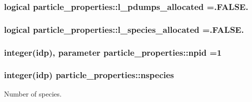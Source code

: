 \subsubsection[{\texorpdfstring{l\+\_\+pdumps\+\_\+allocated}{l_pdumps_allocated}}]{\setlength{\rightskip}{0pt plus 5cm}logical particle\+\_\+properties\+::l\+\_\+pdumps\+\_\+allocated =.F\+A\+L\+S\+E.}\hypertarget{namespaceparticle__properties_a5ab16464c3ac1b31175817e811763fe1}{}\label{namespaceparticle__properties_a5ab16464c3ac1b31175817e811763fe1}
\subsubsection[{\texorpdfstring{l\+\_\+species\+\_\+allocated}{l_species_allocated}}]{\setlength{\rightskip}{0pt plus 5cm}logical particle\+\_\+properties\+::l\+\_\+species\+\_\+allocated =.F\+A\+L\+S\+E.}\hypertarget{namespaceparticle__properties_a3dcd8fa47e189305bb2534a72c4a8d5c}{}\label{namespaceparticle__properties_a3dcd8fa47e189305bb2534a72c4a8d5c}
\subsubsection[{\texorpdfstring{npid}{npid}}]{\setlength{\rightskip}{0pt plus 5cm}integer(idp), parameter particle\+\_\+properties\+::npid =1}\hypertarget{namespaceparticle__properties_a9a2b5f322610353c06693336b21439f7}{}\label{namespaceparticle__properties_a9a2b5f322610353c06693336b21439f7}
\subsubsection[{\texorpdfstring{nspecies}{nspecies}}]{\setlength{\rightskip}{0pt plus 5cm}integer(idp) particle\+\_\+properties\+::nspecies}\hypertarget{namespaceparticle__properties_a5aabee3c3d0e9e902989125d50e03426}{}\label{namespaceparticle__properties_a5aabee3c3d0e9e902989125d50e03426}


Number of species. 

